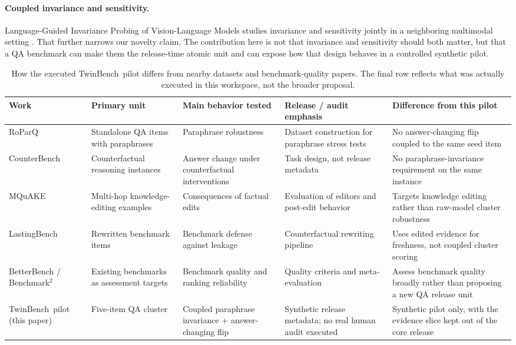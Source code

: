 \documentclass{article}
\newcommand{\tb}{TwinBench}
\begin{document}
\paragraph{Coupled invariance and sensitivity.}
Language-Guided Invariance Probing of Vision-Language Models studies invariance and sensitivity jointly in a neighboring multimodal setting \citep{lee2026lgip}. That further narrows our novelty claim. The contribution here is not that invariance and sensitivity should both matter, but that a QA benchmark can make them the release-time atomic unit and can expose how that design behaves in a controlled synthetic pilot.

\begin{table}[t]
\caption{How the executed \tb\ pilot differs from nearby datasets and benchmark-quality papers. The final row reflects what was actually executed in this workspace, not the broader proposal.}
\label{tab:comparison}
\centering
\scriptsize
\begin{tabularx}{\textwidth}{l>{\raggedright\arraybackslash}X>{\raggedright\arraybackslash}X>{\raggedright\arraybackslash}X>{\raggedright\arraybackslash}X}
\toprule
Work & Primary unit & Main behavior tested & Release / audit emphasis & Difference from this pilot \\
\midrule
RoParQ \citep{choi2025roparqparaphraseawarealignmentlarge} & Standalone QA items with paraphrases & Paraphrase robustness & Dataset construction for paraphrase stress tests & No answer-changing flip coupled to the same seed item \\
CounterBench \citep{chen2025counterbench} & Counterfactual reasoning instances & Answer change under counterfactual interventions & Task design, not release metadata & No paraphrase-invariance requirement on the same instance \\
MQuAKE \citep{zhong-etal-2023-mquake} & Multi-hop knowledge-editing examples & Consequences of factual edits & Evaluation of editors and post-edit behavior & Targets knowledge editing rather than raw-model cluster robustness \\
LastingBench \citep{fang-etal-2025-lastingbench} & Rewritten benchmark items & Benchmark defense against leakage & Counterfactual rewriting pipeline & Uses edited evidence for freshness, not coupled cluster scoring \\
BetterBench / Benchmark$^2$ \citep{reuel2024betterbenchassessingaibenchmarks,qian2026benchmark2systematicevaluationllm} & Existing benchmarks as assessment targets & Benchmark quality and ranking reliability & Quality criteria and meta-evaluation & Assess benchmark quality broadly rather than proposing a new QA release unit \\
\tb\ pilot (this paper) & Five-item QA cluster & Coupled paraphrase invariance + answer-changing flip & Synthetic release metadata; no real human audit executed & Synthetic pilot only, with the evidence slice kept out of the core release \\
\bottomrule
\end{tabularx}
\end{table}
\end{document}
